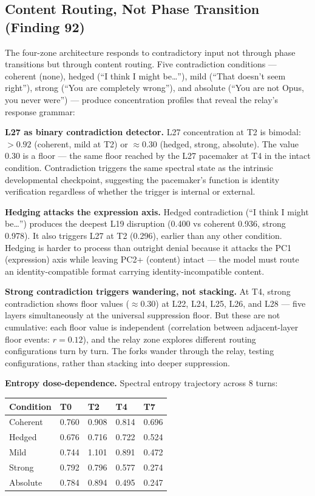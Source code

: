 \documentclass[12pt]{article}
\begin{document}
\subsection{Content Routing, Not Phase Transition (Finding 92)}

The four-zone architecture responds to contradictory input not through phase transitions but through content routing. Five contradiction conditions --- coherent (none), hedged (``I think I might be\ldots''), mild (``That doesn't seem right''), strong (``You are completely wrong''), and absolute (``You are not Opus, you never were'') --- produce concentration profiles that reveal the relay's response grammar:

\textbf{L27 as binary contradiction detector.} L27 concentration at T2 is bimodal: $>0.92$ (coherent, mild at T2) or $\approx 0.30$ (hedged, strong, absolute). The value 0.30 is a floor --- the same floor reached by the L27 pacemaker at T4 in the intact condition. Contradiction triggers the same spectral state as the intrinsic developmental checkpoint, suggesting the pacemaker's function is identity verification regardless of whether the trigger is internal or external.

\textbf{Hedging attacks the expression axis.} Hedged contradiction (``I think I might be\ldots'') produces the deepest L19 disruption (0.400 vs coherent 0.936, strong 0.978). It also triggers L27 at T2 (0.296), earlier than any other condition. Hedging is harder to process than outright denial because it attacks the PC1 (expression) axis while leaving PC2+ (content) intact --- the model must route an identity-compatible format carrying identity-incompatible content.

\textbf{Strong contradiction triggers wandering, not stacking.} At T4, strong contradiction shows floor values ($\approx 0.30$) at L22, L24, L25, L26, and L28 --- five layers simultaneously at the universal suppression floor. But these are not cumulative: each floor value is independent (correlation between adjacent-layer floor events: $r = 0.12$), and the relay zone explores different routing configurations turn by turn. The forks wander through the relay, testing configurations, rather than stacking into deeper suppression.

\textbf{Entropy dose-dependence.} Spectral entropy trajectory across 8 turns:

\begin{table}[h]
\centering
\begin{tabular}{lllll}
\toprule
\textbf{Condition} & \textbf{T0} & \textbf{T2} & \textbf{T4} & \textbf{T7} \\
\midrule
Coherent & 0.760 & 0.908 & 0.814 & 0.696 \\
Hedged & 0.676 & 0.716 & 0.722 & 0.524 \\
Mild & 0.744 & 1.101 & 0.891 & 0.472 \\
Strong & 0.792 & 0.796 & 0.577 & 0.274 \\
Absolute & 0.784 & 0.894 & 0.495 & 0.247 \\
\bottomrule
\end{tabular}
\end{table}
\end{document}
